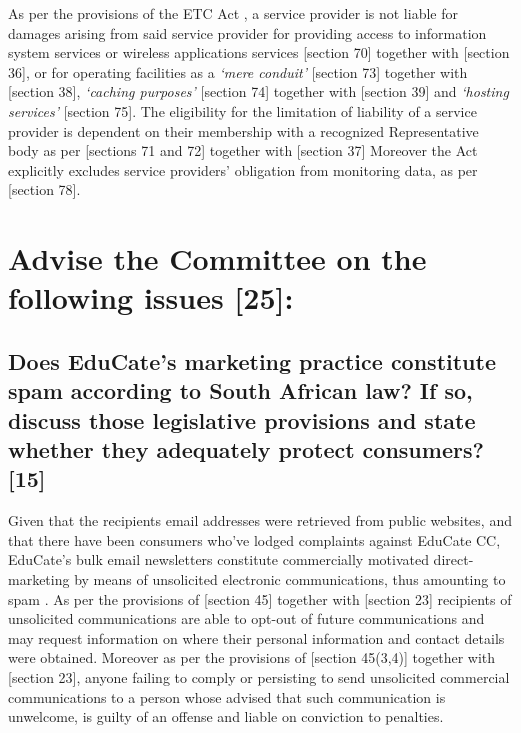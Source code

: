 \documentclass[11pt]{article}
\begin{document}
As per the provisions of the ETC Act \cite{rsa02_elect_comm_trans_act}, a service
provider is not liable for damages arising from said service provider for
providing access to information system services or wireless applications
services [section 70]\cite{rsa02_elect_comm_trans_act} together with [section
36]\cite{rsa12_elect_comm_trans_amend_bill}, or for operating facilities as a
\emph{`mere conduit'} [section 73]\cite{rsa02_elect_comm_trans_act} together with
[section 38]\cite{rsa12_elect_comm_trans_amend_bill}, \emph{`caching purposes'}
[section 74]\cite{rsa02_elect_comm_trans_act} together with [section
39]\cite{rsa12_elect_comm_trans_amend_bill} and \emph{`hosting services'} [section
75]\cite{rsa02_elect_comm_trans_act}. The eligibility for the limitation of
liability of a service provider is dependent on their membership with a
recognized Representative body as per [sections 71 and
72]\cite{rsa02_elect_comm_trans_act} together with [section
37]\cite{rsa12_elect_comm_trans_amend_bill} Moreover the Act explicitly excludes
service providers' obligation from monitoring data, as per [section
78]\cite{rsa02_elect_comm_trans_act}.

\section{Advise the Committee on the following issues [25]:}
\label{sec:org0775555}

\subsection{Does EduCate's marketing practice constitute spam according to South African law? If so, discuss those legislative provisions and state whether they adequately protect consumers? [15]}
\label{sec:org4449c19}

Given that the recipients email addresses were retrieved from public websites,
and that there have been consumers who've lodged complaints against EduCate CC,
EduCate's bulk email newsletters constitute commercially motivated
direct-marketing by means of unsolicited electronic communications, thus
amounting to spam
\cite{hermann14_direct_marketing_vs_spam,tladi08_reg_unsol_comm}. As per the
provisions of [section 45]\cite{rsa02_elect_comm_trans_act} together with [section
23]\cite{rsa12_elect_comm_trans_amend_bill} recipients of unsolicited
communications are able to opt-out of future communications and may request
information on where their personal information and contact details were
obtained. Moreover as per the provisions of [section
45(3,4)]\cite{rsa02_elect_comm_trans_act} together with [section
23]\cite{rsa12_elect_comm_trans_amend_bill}, anyone failing to comply or
persisting to send unsolicited commercial communications to a person whose
advised that such communication is unwelcome, is guilty of an offense and liable
on conviction to penalties.\\
\end{document}
